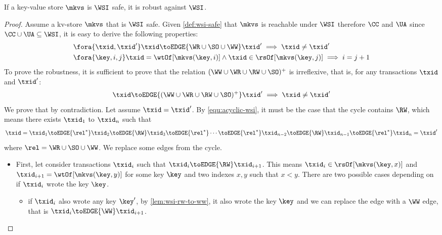 \begin{theorem}
    If a key-value store \( \mkvs \) is \(\WSI\) safe, it is robust against \(\WSI\).
\end{theorem}
\begin{proof}
    Assume a kv-store \( \mkvs \) that is \( \WSI\) safe.
    Given \cref{def:wsi-safe} that \( \mkvs \) is reachable under \(\WSI\) 
    therefore \( \CC \) and \( \UA \) since \( \CC \cup \UA \subseteq \WSI \), 
    it is easy to derive the following properties:
    \begin{align}
        & \fora{\txid, \txid'} \txid \toEDGE{\WR \cup \SO \cup \WW}  \txid' \implies \txid \neq \txid' \label{equ:acyclic-wsi}\\
        & \fora{\key,i,j} \txid = \wtOf[\mkvs(\key,i)] \land \txid \in \rsOf[\mkvs(\key,j)] \implies i = j + 1 \label{equ:wsi-sat-ua} 
    \end{align}
    To prove the robustness, it is sufficient to prove that 
    the relation \( (\WW \cup \WR \cup \RW \cup \SO)^+ \) is irreflexive,
    that is, for any transactions \( \txid \) and \( \txid' \):
    \[
        \txid \toEDGE{(\WW \cup \WR \cup \RW \cup \SO)^+} \txid' \implies \txid \neq \txid'
    \]
    We prove that by contradiction.
    Let assume \( \txid = \txid' \).
    By \cref{equ:acyclic-wsi}, it must be the case that the cycle contains \( \RW \), 
    which means there exists \( \txid_1 \) to \( \txid_n \)  such that
    \[
        \txid = \txid_1 \toEDGE{\rel^*} \txid_2 \toEDGE{\RW} \txid_3 \toEDGE{\rel^*} \cdots \toEDGE{\rel^*} \txid_{n-2} \toEDGE{\RW} \txid_{n-1} \toEDGE{\rel^*}  \txid_n = \txid' 
    \]
    where \( \rel  = \WR \cup \SO \cup \WW \).
    We replace some edges from the cycle.
    \begin{itemize}
        \item First, let consider transactions \( \txid_i \) such that \( \txid_i \toEDGE{\RW} \txid_{i+1}\).
    This means \( \txid_i \in \rsOf[ \mkvs(\key, x ) ]\) 
    and \( \txid_{i+1} = \wtOf[ \mkvs(\key, y ) ] \) for some key \( \key \) and two indexes \( x,y \) such that \( x < y \).
    There are two possible cases depending on if \( \txid_i\) wrote the key \( \key \).
        \begin{itemize}
            \item if \( \txid_i \) also wrote any key \( \key' \), 
                by \cref{lem:wsi-rw-to-ww}, it also wrote the key \( \key \) 
                and we can replace the edge with a \( \WW \) edge, that is \( \txid_i \toEDGE{\WW} \txid_{i+1}\).

\end{itemize}
\end{itemize}
\end{proof}

